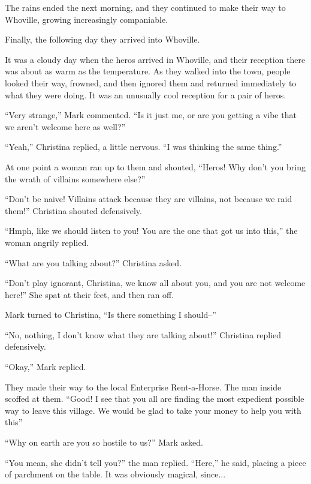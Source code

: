 \documentclass[showtrims,b6paper,draft,10pt]{memoir}
\begin{document}
The rains ended the next morning, and they continued to make their way to Whoville, growing increasingly companiable.

Finally, the following day they arrived into Whoville.

\timeskip


It was a cloudy day when the heros arrived in Whoville, and their reception there was about as warm as the temperature.  As they walked into the town, people looked their way, frowned, and then ignored them and returned immediately to what they were doing.  It was an unusually cool reception for a pair of heros.

``Very strange,'' Mark commented.  ``Is it just me, or are you getting a vibe that we aren't welcome here as well?''

``Yeah,'' Christina replied, a little nervous.  ``I was thinking the same thing.''

At one point a woman ran up to them and shouted,  ``Heros!  Why don't you bring the wrath of villains somewhere else?''

``Don't be naive!  Villains attack because they are villains, not because we raid them!''  Christina shouted defensively.

``Hmph, like we should listen to you!  You are the one that got us into this,'' the woman angrily replied.

``What are you talking about?'' Christina asked.

``Don't play ignorant, Christina, we know all about you, and you are not welcome here!''  She spat at their feet, and then ran off.

Mark turned to Christina, ``Is there something I should--''

``No, nothing, I don't know what they are talking about!''  Christina replied defensively.

``Okay,'' Mark replied.

They made their way to the local Enterprise Rent-a-Horse.  The man inside scoffed at them.  ``Good!  I see that you all are finding the most expedient possible way to leave this village.  We would be glad to take your money to help you with this''

``Why on earth are you so hostile to us?'' Mark asked.

``You mean, she didn't tell you?'' the man replied.  ``Here,'' he said, placing a piece of parchment on the table.  It was obviously magical, since...
\end{document}
